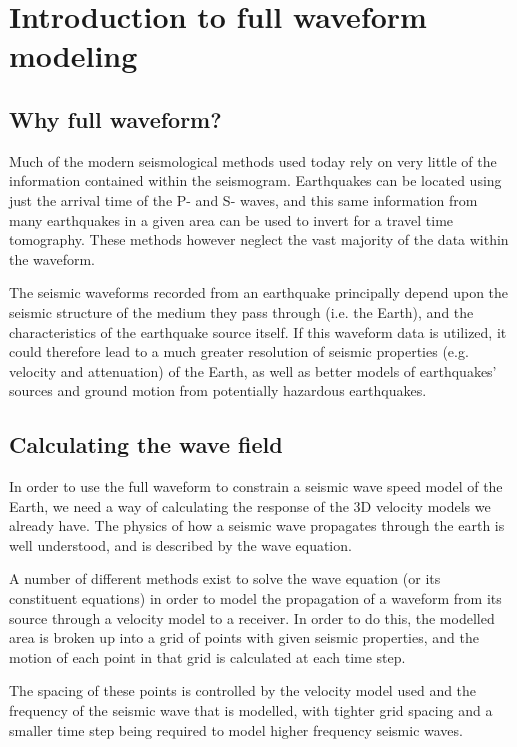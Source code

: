 \documentclass[english]{book}
\begin{document}
\chapter{Introduction to full waveform modeling}
\label{\detokenize{Section2:introduction-to-full-waveform-modeling}}\label{\detokenize{Section2::doc}}

\section{Why full waveform?}
\label{\detokenize{Section2:why-full-waveform}}
Much of the modern seismological methods used today rely on very little
of the information contained within the seismogram. Earthquakes can be
located using just the arrival time of the P- and S- waves, and this
same information from many earthquakes in a given area can be used to
invert for a travel time tomography. These methods however neglect the
vast majority of the data within the waveform.

The seismic waveforms recorded from an earthquake principally depend
upon the seismic structure of the medium they pass through (i.e. the
Earth), and the characteristics of the earthquake source itself. If this
waveform data is utilized, it could therefore lead to a much greater
resolution of seismic properties (e.g. velocity and attenuation) of the
Earth, as well as better models of earthquakes’ sources and ground
motion from potentially hazardous earthquakes.


\section{Calculating the wave field}
\label{\detokenize{Section2:calculating-the-wave-field}}
In order to use the full waveform to constrain a seismic wave speed
model of the Earth, we need a way of calculating the response of the 3D
velocity models we already have. The physics of how a seismic wave
propagates through the earth is well understood, and is described by the
wave equation.

A number of different methods exist to solve the wave equation (or its
constituent equations) in order to model the propagation of a waveform
from its source through a velocity model to a receiver. In order to do
this, the modelled area is broken up into a grid of points with given
seismic properties, and the motion of each point in that grid is
calculated at each time step.

The spacing of these points is controlled by the velocity model used and
the frequency of the seismic wave that is modelled, with tighter grid
spacing and a smaller time step being required to model higher frequency
seismic waves.
\end{document}
